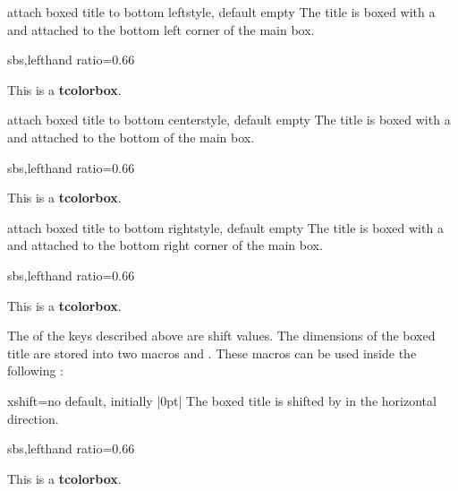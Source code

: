 \begin{docTcbKey}{attach boxed title to bottom left}{}{style, default empty}
The title is boxed with a  and attached to
the bottom left corner of the main box.
\begin{dispExample*}{sbs,lefthand ratio=0.66}
\begin{tcolorbox}[enhanced,title=My title,
  attach boxed title to bottom left]
  This is a \textbf{tcolorbox}.
\end{tcolorbox}
\end{dispExample*}
\end{docTcbKey}

\begin{docTcbKey}{attach boxed title to bottom center}{}{style, default empty}
The title is boxed with a  and attached to
the bottom of the main box.
\begin{dispExample*}{sbs,lefthand ratio=0.66}
\begin{tcolorbox}[enhanced,title=My title,
  attach boxed title to bottom center]
  This is a \textbf{tcolorbox}.
\end{tcolorbox}
\end{dispExample*}
\end{docTcbKey}

\begin{docTcbKey}{attach boxed title to bottom right}{}{style, default empty}
The title is boxed with a  and attached to
the bottom right corner of the main box.
\begin{dispExample*}{sbs,lefthand ratio=0.66}
\begin{tcolorbox}[enhanced,title=My title,
  attach boxed title to bottom right]
  This is a \textbf{tcolorbox}.
\end{tcolorbox}
\end{dispExample*}
\end{docTcbKey}

\clearpage

The  of the keys described above are shift values.
The dimensions of the boxed title are stored into two macros
 and
. These macros can be used inside the
following :

\begin{boxTcbKey}{xshift}{=}{no default, initially |0pt|}
The boxed title is shifted by  in the horizontal direction.
\begin{dispExample*}{sbs,lefthand ratio=0.66}
\begin{tcolorbox}[enhanced,title=My title,
  attach boxed title to top left={xshift=-2mm},
  boxed title style={size=small,colback=blue}]
  This is a \textbf{tcolorbox}.
\end{tcolorbox}
\end{dispExample*}
\end{boxTcbKey}


